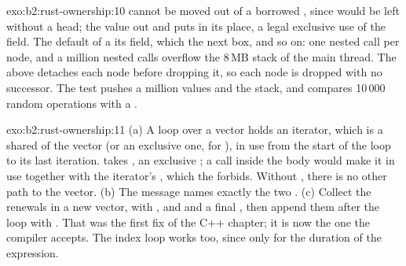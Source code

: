 \begin{solution}{exo:b2:rust-ownership:10}
 cannot be moved out of a borrowed , since  would be left without a head;
  the value out and puts  in its place, a legal exclusive use of the field. The default 
of a   its  field, which  the next box, and so on: one nested call per node, and
a million nested calls overflow the 8\,MB stack of the main thread. The  above detaches each node before
dropping it, so each node is dropped with no successor. The test pushes a million values and  the stack, and
compares 10\,000 random operations with a .
\end{solution}

\begin{solution}{exo:b2:rust-ownership:11}
(a) A loop over a vector holds an iterator, which is a shared  of the vector (or an exclusive one, for
), in use from the start of the loop to its last iteration.  takes , an
exclusive ; a call inside the body would make it in use together with the iterator's , which the
 forbids. Without , there is no other path to the vector. (b)
The message names exactly the two . (c) Collect the renewals in a new vector, with ,
 and  and a final , then append them after the loop with .
That was the first fix of the C++ chapter; it is now the one the compiler accepts. The index loop works too, since
  only for the duration of the expression.
\end{solution}

